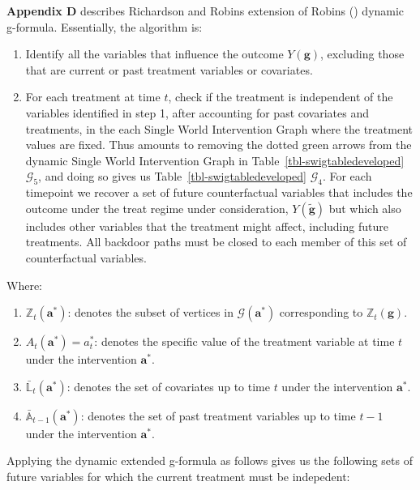 \documentclass[
  single column]{article}
\providecommand{\tightlist}{%
  \setlength{\itemsep}{0pt}\setlength{\parskip}{0pt}}\usepackage{longtable,booktabs,array}
\begin{document}
\textbf{Appendix D} describes Richardson and Robins extension of Robins
() dynamic g-formula. Essentially, the
algorithm is:

\begin{enumerate}
\def\labelenumi{\arabic{enumi}.}
\item
  Identify all the variables that influence the outcome
  \(Y(\mathbf{g})\), excluding those that are current or past treatment
  variables or covariates.
\item
  For each treatment at time \(t\), check if the treatment is
  independent of the variables identified in step 1, after accounting
  for past covariates and treatments, in the each Single World
  Intervention Graph where the treatment values are fixed. Thus amounts
  to removing the dotted green arrows from the dynamic Single World
  Intervention Graph in Table~\ref{tbl-swigtabledeveloped}
  \(\mathcal{G}_5\), and doing so gives us
  Table~\ref{tbl-swigtabledeveloped} \(\mathcal{G}_4\). For each
  timepoint we recover a set of future counterfactual variables that
  includes the outcome under the treat regime under consideration,
  \(Y(\mathbold{\tilde{g}})\) but which also includes other variables
  that the treatment might affect, including future treatments. All
  backdoor paths must be closed to each member of this set of
  counterfactual variables.
\end{enumerate}

Where:

\begin{enumerate}
\def\labelenumi{\arabic{enumi}.}
\tightlist
\item
  \textbf{\(\mathbb{Z}_t(\mathbf{a}^*)\)}: denotes the subset of
  vertices in \(\mathcal{G}(\mathbf{a}^*)\) corresponding to
  \(\mathbb{Z}_t(\mathbf{g})\).
\item
  \textbf{\(A_t(\mathbf{a}^*) = a^*_t\)}: denotes the specific value of
  the treatment variable at time \(t\) under the intervention
  \(\mathbf{a}^*\).
\item
  \textbf{\(\bar{\mathbb{L}}_t(\mathbf{a}^*)\)}: denotes the set of
  covariates up to time \(t\) under the intervention \(\mathbf{a}^*\).
\item
  \textbf{\(\bar{\mathbb{A}}_{t-1}(\mathbf{a}^*)\)}: denotes the set of
  past treatment variables up to time \(t-1\) under the intervention
  \(\mathbf{a}^*\).
\end{enumerate}

Applying the dynamic extended g-formula as follows gives us the
following sets of future variables for which the current treatment must
be indepedent:
\end{document}
